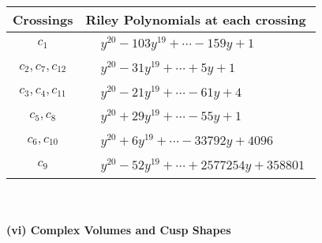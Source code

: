 \documentclass[1p]{elsarticle_modified}
\theoremstyle{definition}
\begin{document}
\begin{tabular}{m{50pt}|m{274pt}}
Crossings & \hspace{64pt}Riley Polynomials at each crossing \\
\hline $$\begin{aligned}c_{1}\end{aligned}$$&$\begin{aligned}
&y^{20}-103 y^{19}+\cdots-159 y+1
\end{aligned}$\\
\hline $$\begin{aligned}c_{2},c_{7},c_{12}\end{aligned}$$&$\begin{aligned}
&y^{20}-31 y^{19}+\cdots+5 y+1
\end{aligned}$\\
\hline $$\begin{aligned}c_{3},c_{4},c_{11}\end{aligned}$$&$\begin{aligned}
&y^{20}-21 y^{19}+\cdots-61 y+4
\end{aligned}$\\
\hline $$\begin{aligned}c_{5},c_{8}\end{aligned}$$&$\begin{aligned}
&y^{20}+29 y^{19}+\cdots-55 y+1
\end{aligned}$\\
\hline $$\begin{aligned}c_{6},c_{10}\end{aligned}$$&$\begin{aligned}
&y^{20}+6 y^{19}+\cdots-33792 y+4096
\end{aligned}$\\
\hline $$\begin{aligned}c_{9}\end{aligned}$$&$\begin{aligned}
&y^{20}-52 y^{19}+\cdots+2577254 y+358801
\end{aligned}$\\
\hline
\end{tabular}\\~\\
\newpage\flushleft \textbf{(vi) Complex Volumes and Cusp Shapes}
\end{document}

